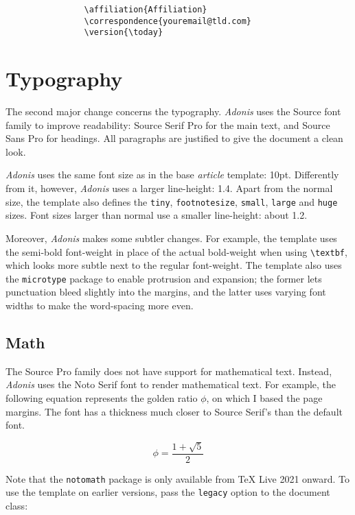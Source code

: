 \documentclass{adonis}
\begin{document}
			\begin{verbatim}
				\affiliation{Affiliation}
				\correspondence{youremail@tld.com}
				\version{\today}
			\end{verbatim}
		
	\section{Typography}
	
		The second major change concerns the typography.
		\textit{Adonis} uses the Source font family to improve readability: Source Serif Pro for the main text, and Source Sans Pro for headings.
		All paragraphs are justified to give the document a clean look.
		
		\textit{Adonis} uses the same font size as in the base \textit{article} template: 10pt.
		Differently from it, however, \textit{Adonis} uses a larger line-height: 1.4.
		Apart from the normal size, the template also defines the \texttt{tiny}, \texttt{footnotesize}, \texttt{small}, \texttt{large} and \texttt{huge} sizes.
		Font sizes larger than normal use a smaller line-height: about 1.2.
		
		Moreover, \textit{Adonis} makes some subtler changes.
		For example, the template uses the semi-bold font-weight in place of the actual bold-weight when using \texttt{\textbackslash{}textbf}, which looks more subtle next to the regular font-weight.
		The template also uses the \texttt{microtype} package to enable protrusion and expansion; the former lets punctuation bleed slightly into the margins, and the latter uses varying font widths to make the word-spacing more even.
		
		\subsection{Math}
		
			The Source Pro family does not have support for mathematical text.
			Instead, \textit{Adonis} uses the Noto Serif font to render mathematical text.
			For example, the following equation represents the golden ratio $\phi$, on which I based the page margins.
			The font has a thickness much closer to Source Serif's than the default font.
		
			\begin{equation}
				\phi = \frac{1 + \sqrt{5}}{2}
			\end{equation}
		
			Note that the \texttt{notomath} package is only available from TeX Live 2021 onward.
			To use the template on earlier versions, pass the \texttt{legacy} option to the document class:
			
\end{document}
